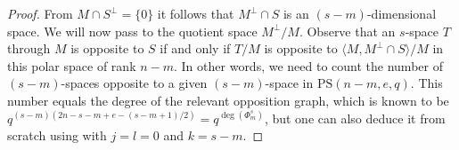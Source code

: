 \documentclass[11pt]{article}
\newtheorem{lemma}[thm]{Lemma}
\newcommand{\PS}{\mathrm{PS}}
\begin{document}
\begin{proof}
    From $M \cap S^\perp = \{0\}$ it follows that $M^\perp \cap S$ is an $(s-m)$-dimensional space. We will now pass to the quotient space $M^\perp /M$.  Observe that an $s$-space $T$ through $M$ is opposite to $S$ if and only if $T/M$ is opposite to $\langle M, M^\perp \cap S \rangle /M$ in this polar space of rank $n-m$. In other words, we need to count the number of $(s-m)$-spaces opposite to a given $(s-m)$-space in $\PS(n-m,e,q)$. This number equals the degree of the relevant opposition graph, which is known to be $q^{(s-m)(2n-s-m+e-(s-m+1)/2)} = q^{\deg(\Phi_m^s)}$, but one can also deduce it from scratch using  with $j=l=0$ and $k=s-m$.
\end{proof}

\end{document}
